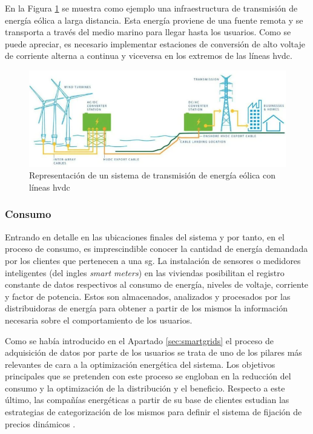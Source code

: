 \vspace{3mm}

En la Figura \ref{fig:hvdc} se muestra como ejemplo una infraestructura de transmisión de energía eólica a larga distancia. Esta energía proviene de una fuente remota y se transporta a través del medio marino para llegar hasta los usuarios. Como se puede apreciar, es necesario implementar estaciones de conversión de alto voltaje de corriente alterna a continua y viceversa en los extremos de las líneas \gls{hvdc}.

\begin{figure}[h!]
  \centering
  \includegraphics[width=1\textwidth]{img/teoria/hvdc.png}
  \caption{Representación de un sistema de transmisión de energía eólica con líneas \acrshort{hvdc}~\cite{hvdc2}}
  \label{fig:hvdc}
\end{figure}

\subsubsection{Consumo}
\label{sec:consumo}

Entrando en detalle en las ubicaciones finales del sistema y por tanto, en el proceso de consumo, es imprescindible conocer la cantidad de energía demandada por los clientes que pertenecen a una \gls{sg}. La instalación de sensores o medidores inteligentes (del ingles \textit{smart meters}) \cite{stab} en las viviendas posibilitan el registro constante de datos respectivos al consumo de energía, niveles de voltaje, corriente y factor de potencia. Estos son almacenados, analizados y procesados por las distribuidoras de energía para obtener a partir de los mismos la información necesaria sobre el comportamiento de los usuarios. 

\vspace{3mm}

Como se había introducido en el Apartado \ref{sec:smartgrids} el proceso de adquisición de datos por parte de los usuarios se trata de uno de los pilares más relevantes de cara a la optimización energética del sistema. Los objetivos principales que se pretenden con este proceso se engloban en la reducción del consumo y la optimización de la distribución y el beneficio. Respecto a este último, las compañías energéticas a partir de su base de clientes estudian las estrategias de categorización de los mismos para definir el sistema de fijación de precios dinámicos \cite{stab}.

